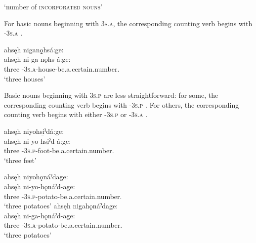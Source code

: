 \ea\label{ex:countingex12}    ‘number of \textsc{incorporated nouns}’
\z

For basic nouns beginning with  \textsc{3s.a}, the corresponding counting verb begins with  \textsc{\partitive-3s.a} .

\newpage
\ea\label{ex:countingex13}
ahsęh niganǫ̱hsá:ge:\\
\gll ahsęh ni-ga-nǫ̱hs-á:ge:\\
three {\partitive}-\textsc{3s.a}-house-be.a.certain.number.{\stative}\\
\glt `three houses'
\z


Basic nouns beginning with  \textsc{3s.p} are less straightforward: for some, the corresponding counting verb begins with   \textsc{\partitive-3s.p} . For others, the corresponding counting verb begins with either  \textsc{\partitive-3s.p} or  \textsc{\partitive-3s.a} .

\ea\label{ex:countingex14} 
ahsęh niyohsi̱ˀdá:ge:\\
\gll ahsęh ni-yo-hsi̱ˀd-á:ge:\\
three {\partitive}-\textsc{3s.p}-foot-be.a.certain.number.{\stative}\\
\glt `three feet'
\z


\ea\label{ex:countingex15} 
\ea ahsęh niyohǫnáˀdage:\\
\gll ahsęh ni-yo-hǫnáˀd-age:\\
three {\partitive}-\textsc{3s.p}-potato-be.a.certain.number.{\stative}\\
\glt `three potatoes'
\ex ahsęh nigahǫnáˀdage:\\
\gll ahsęh ni-ga-hǫnáˀd-age:\\
three  {\partitive}-\textsc{3s.a}-potato-be.a.certain.number.{\stative}\\
\glt `three potatoes'
\z
\z

